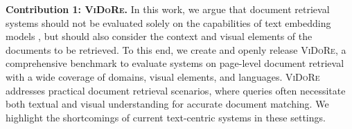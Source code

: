 
\noindent\textbf{Contribution 1: \textsc{ViDoRe}.}
In this work, we argue that document retrieval systems should not be evaluated solely on the capabilities of text embedding models , but should also consider the context and visual elements of the documents to be retrieved. To this end, we create and openly release \textsc{ViDoRe}, a comprehensive benchmark to evaluate systems on page-level document retrieval with a wide coverage of domains, visual elements, and languages. \textsc{ViDoRe} addresses practical document retrieval scenarios, where queries often necessitate both textual and visual understanding for accurate document matching. We highlight the shortcomings of current text-centric systems in these settings.

